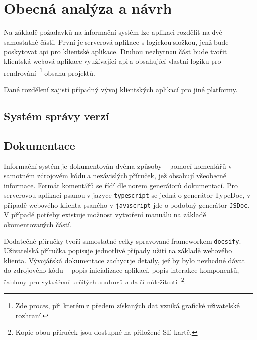 \chapter{Obecná analýza a návrh}

Na základě požadavků na informační systém lze aplikaci rozdělit na dvě samostatné části. První je serverová aplikace s logickou složkou, jenž bude poskytovat \gls{api} pro klientské aplikace. Druhou nezbytnou část bude tvořit klientská webová aplikace využívající \gls{api} a obsahující vlastní logiku pro rendrování~\footnote{Zde proces, při kterém z předem získaných dat vzniká grafické uživatelské rozhraní.} obsahu projektů.

Dané rozdělení zajistí případný vývoj klientských aplikací pro jiné platformy.






\section{Systém správy verzí}





\section{Dokumentace}

Informační systém je dokumentován dvěma způsoby -- pomocí komentářů v samotném zdrojovém kódu a nezávislých příruček, jež obsahují všeobecné informace. Formát komentářů se řídí dle norem generátorů dokumentací. Pro serverovou aplikaci psanou v jazyce \texttt{typescript} se jedná o generátor TypeDoc, v případě webového klienta psaného v \texttt{javascript} jde o podobný generátor \texttt{JSDoc}. V případě potřeby existuje možnost vytvoření manuálu na základě okomentovaných částí.

Dodatečné příručky tvoří samostatné celky spravované frameworkem \texttt{docsify}. Uživatelská příručka popisuje jednotlivé případy užití na základě webového klienta. Vývojářská dokumentace zachycuje detaily, jež by bylo nevhodné dávat do zdrojového kódu -- popis inicializace aplikací, popis interakce komponentů, šablony pro vytváření určitých souborů a další náležitosti~\footnote{Kopie obou příruček jsou dostupné na přiložené SD kartě.}.


